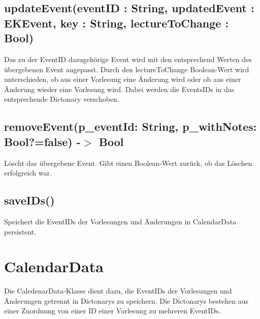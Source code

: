 \subsection[updateEvent]{updateEvent(eventID : String, updatedEvent : EKEvent, key : String, lectureToChange : Bool)}
Das zu der EventID dazugehörige Event wird mit den entsprechend Werten des übergebenen Event angepasst. Durch den lectureToChange Boolean-Wert wird unterschieden, ob aus einer Vorlesung eine Änderung wird oder ob aus einer Änderung wieder eine Vorlesung wird. Dabei werden die EventsIDs in das entsprechende Dictonary verschoben.

\subsection[removeEvent]{removeEvent(p\_eventId: String, p\_withNotes: Bool?=false) -$>$ Bool}
Löscht das übergebene Event. Gibt einen Boolean-Wert zurück, ob das Löschen erfolgreich war.

\subsection[saveIDs]{saveIDs()}
Speichert die EventIDs der Vorlesungen und Änderungen in CalendarData persistent.

\newpage
\section{CalendarData}
Die CaledenarData-Klasse dient dazu, die EventIDs der Vorlesungen und Änderungen getrennt in Dictonarys zu speichern.
Die Dictonarys bestehen aus einer Zuordnung von einer ID einer Vorlesung zu mehreren EventIDs.

